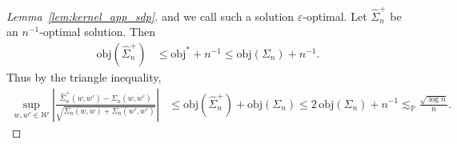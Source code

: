 \documentclass[11pt,lof]{puthesis}
\renewcommand{\P}{\ensuremath{\mathbb{P}}}
\newcommand{\cW}{\ensuremath{\mathcal{W}}}
\newcommand{\objective}{\ensuremath{\mathrm{obj}}}
\theoremstyle{break}
\theoremstyle{proof}
\newtheorem{proof}{Proof}
\begin{document}
\begin{proof}[Lemma~\ref{lem:kernel_app_sdp}]
  and we call such a solution $\varepsilon$-optimal.
  Let $\hat \Sigma_n^+$ be an $n^{-1}$-optimal solution.
  Then
  \begin{align*}
    \objective(\hat \Sigma_n^+)
    &\leq \objective^* + n^{-1}
    \leq \objective(\Sigma_n) + n^{-1}.
  \end{align*}
  Thus by the triangle inequality,
  \begin{align*}
    \sup_{w,w' \in \cW}
    \left|
    \frac{\hat \Sigma_n^+(w,w') - \Sigma_n(w,w')}
    {\sqrt{\Sigma_n(w,w) + \Sigma_n(w',w')}}
    \right|
    &\leq
    \objective(\hat \Sigma_n^+)
    + \objective(\Sigma_n)
    \leq 2 \, \objective(\Sigma_n) + n^{-1}
    \lesssim_\P
    \frac{\sqrt{\log n}}{n}.
  \end{align*}
\end{proof}
\end{document}
